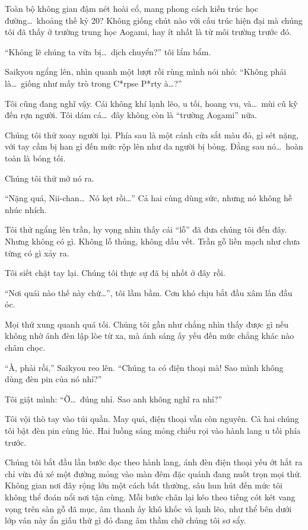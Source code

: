 \documentclass[../main.tex]{subfiles}
\begin{document}
Toàn bộ không gian đậm nét hoài cổ, mang phong cách kiến trúc học đường\dots\ khoảng thế kỷ 20?
Không giống chút nào với cấu trúc hiện đại mà chúng tôi đã thấy ở trường trung học Aogami, hay ít nhất là từ môi trường trước đó.

``Không lẽ chúng ta vừa bị\dots\ dịch chuyển?'' tôi lẩm bẩm.

Saikyou ngẩng lên, nhìn quanh một lượt rồi rùng mình nói nhỏ: ``Không phải là\dots\ giống như mấy trò trong C*rpse P*rty à\dots?''

Tôi cũng đang nghĩ vậy. Cái không khí lạnh lẽo, u tối, hoang vu, và\dots\ mùi cũ kỹ đến rợn người. Tôi dám cá\dots\ đây không còn là ``trường Aogami'' nữa.

Chúng tôi thử xoay người lại. Phía sau là một cánh cửa sắt màu đỏ, gỉ sét nặng, với tay cầm bị han gỉ đến mức rộp lên như da người bị bỏng. Đằng sau nó\dots\ hoàn toàn là bóng tối.

Chúng tôi thử mở nó ra.

``Nặng quá, Nii-chan\dots\ Nó kẹt rồi\dots''
Cả hai cùng dùng sức, nhưng nó không hề nhúc nhích.

Tôi thử ngẩng lên trần, hy vọng nhìn thấy cái ``lỗ'' đã đưa chúng tôi đến đây. Nhưng không có gì. Không lỗ thủng, không dấu vết. Trần gỗ liền mạch như chưa từng có gì xảy ra.

Tôi siết chặt tay lại. Chúng tôi thực sự đã bị nhốt ở đây rồi.

``Nơi quái nào thế này chứ\dots'', tôi lầm bầm. Cơn khó chịu bắt đầu xâm lấn đầu óc.

Mọi thứ xung quanh quá tối. Chúng tôi gần như chẳng nhìn thấy được gì nếu không nhờ ánh đèn lập lòe từ xa, mà ánh sáng ấy yếu đến mức chẳng khác nào châm chọc.

``À, phải rồi,'' Saikyou reo lên. ``Chúng ta có điện thoại mà! Sao mình không dùng đèn pin của nó nhỉ?''

Tôi giật mình: ``Ờ\dots\ đúng nhỉ. Sao anh không nghĩ ra nhỉ?''

Tôi vội thò tay vào túi quần. May quá, điện thoại vẫn còn nguyên. Cả hai chúng tôi bật đèn pin cùng lúc. Hai luồng sáng mỏng chiếu rọi vào hành lang u tối phía trước.

Chúng tôi bắt đầu lần bước dọc theo hành lang, ánh đèn điện thoại yếu ớt hắt ra chỉ vừa đủ xé một đường mỏng vào màn đêm đặc quánh đang nuốt trọn mọi thứ. Không gian nơi đây rộng lớn một cách bất thường, sâu hun hút đến mức tôi không thể đoán nổi nơi tận cùng. Mỗi bước chân lại kéo theo tiếng cót két vang vọng trên sàn gỗ đã mục, âm thanh ấy khô khốc và lạnh lẽo, như thể bên dưới lớp ván này ẩn giấu thứ gì đó đang âm thầm chờ chúng tôi sơ sẩy.
\end{document}
